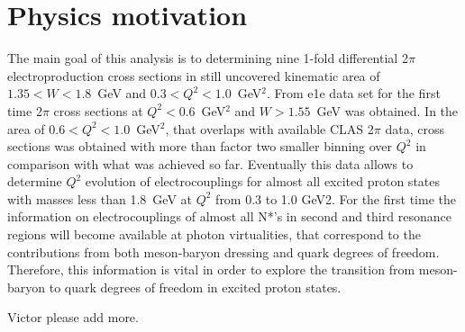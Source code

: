 \chapter{Physics motivation}

The main goal of this analysis is to determining nine 1-fold differential 2$\pi$ electroproduction cross sections in still uncovered kinematic area of $1.35 < W < 1.8$~GeV and $0.3 < Q^{2} < 1.0$~GeV$^{2}$. From e1e data set for the first time 2$\pi$ cross sections at $Q^{2} < 0.6$~GeV$^{2}$ and $W > 1.55$~GeV was obtained. In the area of $0.6 < Q^{2} < 1.0$~GeV$^{2}$, that overlaps with available CLAS 2$\pi$ data, cross sections was obtained  with more than factor two smaller binning over $Q^{2}$ in comparison with what was achieved so far. Eventually this data allows to determine $Q^{2}$ evolution of electrocouplings for almost all excited proton states with masses less than 1.8~GeV at $Q^{2}$ from 0.3 to 1.0 GeV2. For the first time the information on electrocouplings of almost all N*'s in second and third resonance regions will become available at photon virtualities, that correspond to the contributions from both meson-baryon dressing and quark degrees of freedom. Therefore, this information is vital in order to explore the transition from meson-baryon to quark degrees of freedom in excited proton states.

Victor please add more.

